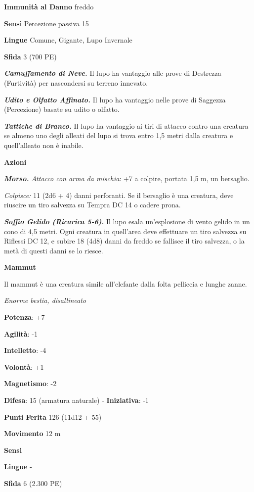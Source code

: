 \begin{multicols}{2}
\textbf{Immunità al Danno} freddo

\textbf{Sensi} Percezione passiva 15

\textbf{Lingue} Comune, Gigante, Lupo Invernale

\textbf{Sfida} 3 (700 PE)

\emph{\textbf{Camuffamento di Neve.}} Il lupo ha vantaggio alle prove di
Destrezza (Furtività) per nascondersi su terreno innevato.

\emph{\textbf{Udito e Olfatto Affinato.}} Il lupo ha vantaggio nelle
prove di Saggezza (Percezione) basate su udito o olfatto.

\emph{\textbf{Tattiche di Branco.}} Il lupo ha vantaggio ai tiri di
attacco contro una creatura se almeno uno degli alleati del lupo si
trova entro 1,5 metri dalla creatura e quell'alleato non è inabile.

\textbf{Azioni}

\emph{\textbf{Morso.} Attacco con arma da mischia}: +7 a colpire,
portata 1,5 m, un bersaglio.

\emph{Colpisce:} 11 (2d6 + 4) danni perforanti. Se il bersaglio è una
creatura, deve riuscire un tiro salvezza su Tempra DC 14 o cadere prona.

\emph{\textbf{Soffio Gelido (Ricarica 5-6).}} Il lupo esala
un'esplosione di vento gelido in un cono di 4,5 metri. Ogni creatura in
quell'area deve effettuare un tiro salvezza su Riflessi DC 12, e subire
18 (4d8) danni da freddo se fallisce il tiro salvezza, o la metà di
questi danni se lo riesce.

\textbf{Mammut}

Il mammut è una creatura simile all'elefante dalla folta pelliccia e
lunghe zanne.

\emph{Enorme bestia, disallineato}

\textbf{Potenza}: +7

\textbf{Agilità}: -1

\textbf{Intelletto}: -4

\textbf{Volontà}: +1

\textbf{Magnetismo}: -2

\textbf{Difesa}: 15 (armatura naturale) - \textbf{Iniziativa}: -1

\textbf{Punti Ferita} 126 (11d12 + 55)

\textbf{Movimento} 12 m

\textbf{Sensi} 

\textbf{Lingue} -

\textbf{Sfida} 6 (2.300 PE)


\end{multicols}
